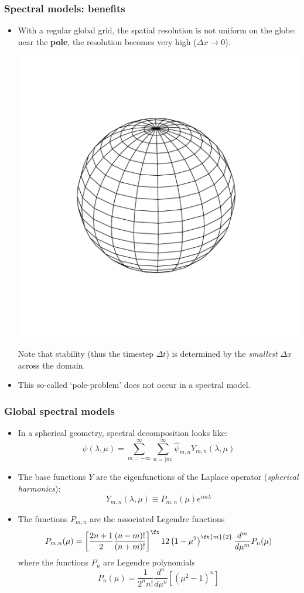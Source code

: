 \documentclass[aspectratio=43,9pt]{beamer}
\begin{document}
%
%
\begin{frame}
	\frametitle{Spectral models: benefits}
	\vfill\begin{itemize}
		\item With a regular global grid, the spatial resolution is not uniform on the globe: near the \textbf{pole}, the resolution becomes very high ($\Delta x\rightarrow0$).
			\begin{center}
				\includegraphics[width=.5\textwidth]{poleproblem}
			\end{center}\vspace*{-5mm}
			Note that stability (thus the timestep $\Delta t$) is determined by the \emph{smallest} $\Delta x$ across the domain.\vfill
		\item This so-called `pole-problem' does not occur in a spectral model.
	\end{itemize}\vfill
\end{frame}
%
%
\begin{frame}
	\frametitle{Global spectral models}
	\vfill\begin{itemize}
		\item In a spherical geometry, spectral decomposition looks like:
			\begin{equation*}
				\psi (\lambda, \mu) = \sum_{m=-\infty}^\infty \sum_{n = | m |}^\infty  \hat\psi_{m,n} Y_{m,n} (\lambda, \mu )
			\end{equation*}\vfill
		\item The base functions $Y$ are the eigenfunctions of the Laplace operator (\emph{spherical harmonics}):
			\begin{equation*}
				Y_{m,n} (\lambda, \mu ) \equiv P_{m,n} (\mu ) e^{im\lambda}
			\end{equation*}\vfill
		\item The functions $P_{m,n}$ are the associated Legendre functions
			\begin{equation*}
				P_{m,n} (\mu ) = \left[ \frac{2 n +1}{2} \frac{(n-m)!}{(n+m)!} \right]^\ft12 \left( 1 - \mu^2 \right)^\ft{m}{2} \frac{d^m}{d \mu^m} P_n (\mu)
			\end{equation*}
			where the functions $P_n$ are Legendre polynomials
			\begin{equation*}
				P_n (\mu) = \frac{1}{2^n n!} \frac{d^n}{d \mu^n} \left[(\mu^2 - 1)^n \right]
			\end{equation*}
	\end{itemize}\vfill
\end{frame}
\end{document}
